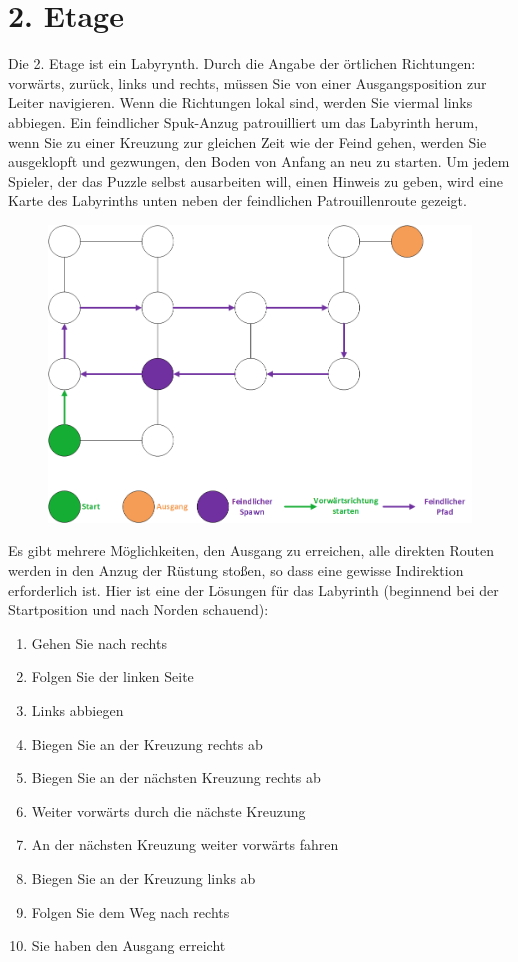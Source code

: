 \documentclass{article}
\begin{document}
\section*{2. Etage}
Die 2. Etage ist ein Labyrynth. Durch die Angabe der \"{o}rtlichen Richtungen: vorw\"{a}rts, zur\"{u}ck, links und rechts, m\"{u}ssen Sie von einer Ausgangsposition zur Leiter navigieren. Wenn die Richtungen lokal sind, werden Sie viermal links abbiegen. Ein feindlicher Spuk-Anzug patrouilliert um das Labyrinth herum, wenn Sie zu einer Kreuzung zur gleichen Zeit wie der Feind gehen, werden Sie ausgeklopft und gezwungen, den Boden von Anfang an neu zu starten. Um jedem Spieler, der das Puzzle selbst ausarbeiten will, einen Hinweis zu geben, wird eine Karte des Labyrinths unten neben der feindlichen Patrouillenroute gezeigt.

\begin{figure}[htb]
	\centering
	\includegraphics[width=4.5in]{Floor2-Map.png}
\end{figure}

Es gibt mehrere M\"{o}glichkeiten, den Ausgang zu erreichen, alle direkten Routen werden in den Anzug der R\"{u}stung sto\ss{}en, so dass eine gewisse Indirektion erforderlich ist. Hier ist eine der L\"{o}sungen f\"{u}r das Labyrinth (beginnend bei der Startposition und nach Norden schauend):

\begin{enumerate}
	\item Gehen Sie nach rechts
	\item Folgen Sie der linken Seite
	\item Links abbiegen
	\item Biegen Sie an der Kreuzung rechts ab
	\item Biegen Sie an der n\"{a}chsten Kreuzung rechts ab
	\item Weiter vorw\"{a}rts durch die n\"{a}chste Kreuzung
	\item An der n\"{a}chsten Kreuzung weiter vorw\"{a}rts fahren
	\item Biegen Sie an der Kreuzung links ab
	\item Folgen Sie dem Weg nach rechts
	\item Sie haben den Ausgang erreicht
\end{enumerate}
\end{document}
